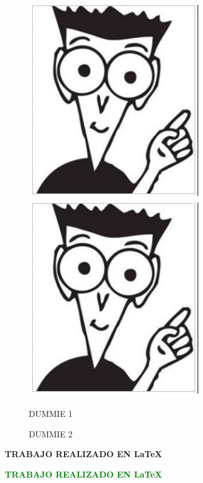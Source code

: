 \documentclass[12pt,a4paper]{book}
\begin{document}
\begin{figure}[hbtp]
\centering
\includegraphics[scale=.4]{dummie.jpg}
\includegraphics[scale=.4]{dummie.jpg}
\caption{DUMMIE 1}
\caption{DUMMIE 2}
\end{figure}



\begin{center}
\textbf{TRABAJO REALIZADO EN \LaTeX} 
\end{center}


\begin{tiny}
\textcolor{green}{\textbf{TRABAJO REALIZADO EN \LaTeX}}
\end{tiny}
\end{document}

